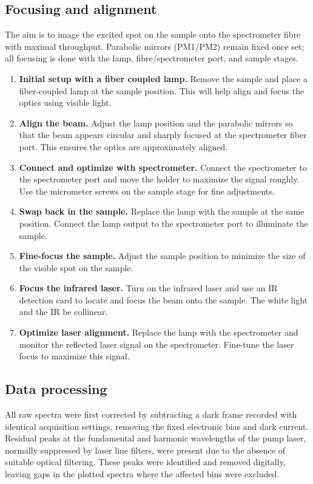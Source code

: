 \documentclass[
	parskip=half,
	a4paper,
]{scrarticle}
\begin{document}
\subsection{Focusing and alignment}
The aim is to image the excited spot on the sample onto the spectrometer fibre with maximal throughput. Parabolic mirrors (PM1/PM2) remain fixed once set; all focusing is done with the lamp, fibre/spectrometer port, and sample stages.

\begin{enumerate}
  \item \textbf{Initial setup with a fiber coupled lamp.}  
  Remove the sample and place a fiber-coupled lamp at the sample position. This will help align and focus the optics using visible light.

  \item \textbf{Align the beam.}  
  Adjust the lamp position and the parabolic mirrors so that the beam appears circular and sharply focused at the spectrometer fiber port. This ensures the optics are approximately aligned.

  \item \textbf{Connect and optimize with spectrometer.}  
  Connect the spectrometer to the spectrometer port and move the holder to maximize the signal roughly. Use the micrometer screws on the sample stage for fine adjustments.

  \item \textbf{Swap back in the sample.}  
  Replace the lamp with the sample at the same position. Connect the lamp output to the spectrometer port to illuminate the sample.

  \item \textbf{Fine-focus the sample.}  
  Adjust the sample position to minimize the size of the visible spot on the sample.

  \item \textbf{Focus the infrared laser.}  
  Turn on the infrared laser and use an IR detection card to locate and focus the beam onto the sample. The white light and the IR be collinear.

  \item \textbf{Optimize laser alignment.}  
  Replace the lamp with the spectrometer and monitor the reflected laser signal on the spectrometer. Fine-tune the laser focus to maximize this signal.
\end{enumerate}

\subsection{Data processing}
All raw spectra were first corrected by subtracting a dark frame recorded with identical acquisition settings, removing the fixed electronic bias and dark current.  
Residual peaks at the fundamental and harmonic wavelengths of the pump laser, normally suppressed by laser line filters, were present due to the absence of suitable optical filtering.  
These peaks were identified and removed digitally, leaving gaps in the plotted spectra where the affected bins were excluded.  
\end{document}
